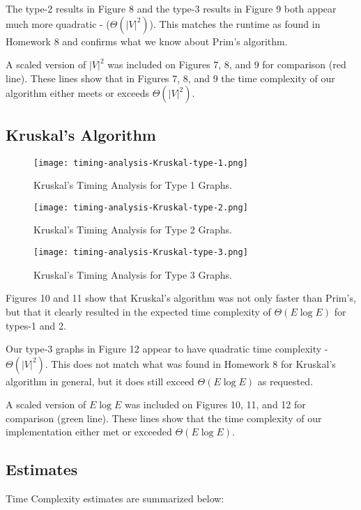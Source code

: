 \documentclass{article}
\begin{document}
The type-2 results in Figure 8 and the type-3 results in Figure 9 both appear much more quadratic - ($\Theta(|V|^2)$). This matches the runtime as found in Homework 8 and confirms what we know about Prim's algorithm. 

A scaled version of $|V|^2$ was included on Figures 7, 8, and 9 for comparison (red line). These lines show that in Figures 7, 8, and 9 the time complexity of our algorithm either meets or exceeds $\Theta(|V|^2)$.

\newpage
\subsection*{Kruskal's Algorithm}

\begin{figure}[h!]
\centering
\texttt{[image: timing-analysis-Kruskal-type-1.png]}
\caption{Kruskal's Timing Analysis for Type 1 Graphs.}
\end{figure}

\begin{figure}[h!]
\centering
\texttt{[image: timing-analysis-Kruskal-type-2.png]}
\caption{Kruskal's Timing Analysis for Type 2 Graphs.}
\end{figure}

\newpage
\begin{figure}[h!]
\centering
\texttt{[image: timing-analysis-Kruskal-type-3.png]}
\caption{Kruskal's Timing Analysis for Type 3 Graphs.}
\end{figure}

Figures 10 and 11 show that Kruskal's algorithm was not only faster than Prim's, but that it clearly resulted in the expected time complexity of $\Theta(E\log E)$ for types-1 and 2. 

Our type-3 graphs in Figure 12 appear to have quadratic time complexity - $\Theta(|V|^2)$. This does not match what was found in Homework 8 for Kruskal's algorithm in general, but it does still exceed $\Theta(E\log E)$ as requested.

A scaled version of $E\log E$ was included on Figures 10, 11, and 12 for comparison (green line). These lines show that the time complexity of our implementation either met or exceeded $\Theta(E\log E)$.

\subsection*{Estimates}
Time Complexity estimates are summarized below:
\end{document}
